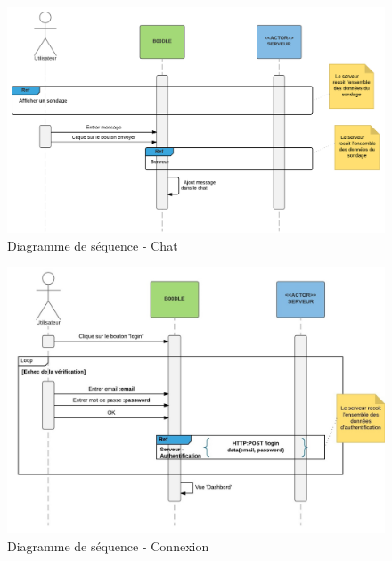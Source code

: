 \documentclass[titlepage]{report}
\begin{document}
\begin{figure}[h]
	\caption{Diagramme de séquence - Chat}
	\label{annexe_diagramme_sequence_chat}
	\centering
	\includegraphics[width=\textwidth]{figures/diagrammes/sequence_Chat.png}
\end{figure}

\begin{figure}[h]
	\caption{Diagramme de séquence - Connexion}
	\label{annexe_diagramme_sequence_connexion}
	\centering
	\includegraphics[width=\textwidth]{figures/diagrammes/sequence_connexion.png}
\end{figure}
\end{document}
